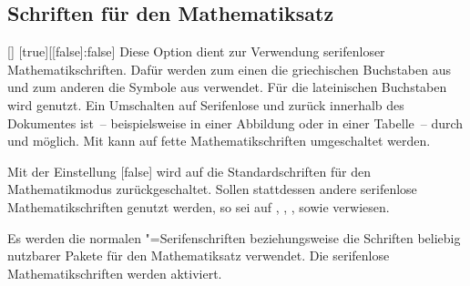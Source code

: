 \subsection{Schriften für den Mathematiksatz}
\begin{Declaration}{[\PBoolean]}%
  [true][[false]:false]
\printdeclarationlist%
\label{sec:math}
%
Diese Option dient zur Verwendung serifenloser Mathematikschriften. Dafür 
werden zum einen die griechischen Buchstaben aus  und zum 
anderen die Symbole aus  verwendet. Für die lateinischen 
Buchstaben wird \Univers genutzt. Ein Umschalten auf Serifenlose und zurück 
innerhalb des Dokumentes ist~-- beispielsweise in einer Abbildung oder in einer 
Tabelle~-- durch  und 
 möglich. Mit
 kann auf fette Mathematikschriften umgeschaltet werden.

Mit der Einstellung [false] wird auf die Standardschriften
für den Mathematikmodus zurückgeschaltet. Sollen stattdessen andere serifenlose 
Mathematikschriften genutzt werden, so sei auf , 
, ,  sowie 
 verwiesen.
%
\begin{values}
\itemfalse
  Es werden die normalen "=Serifenschriften beziehungsweise die 
  Schriften beliebig nutzbarer Pakete für den Mathematiksatz verwendet.
\itemtrue*
  Die serifenlose Mathematikschriften werden aktiviert.
\end{values}
\end{Declaration}

